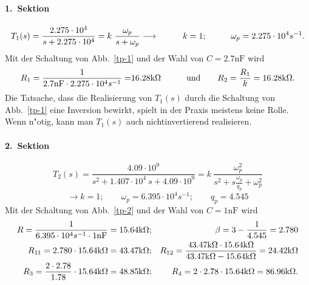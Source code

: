 \paragraph{1.~Sektion}
\[ T_1(s)=\frac{2.275 \cdot 10^4}{s + 2.275 \cdot 10^4}
         =k~ \frac{\omega_p}{s + \omega_p} \longrightarrow \hspace*{1cm} k=1; \hspace*{1cm}
   \omega_p=2.275 \cdot 10^4 s^{-1}. \]
\nit Mit der Schaltung von Abb.~\ref{tp-1} und der Wahl von $C=2.7\mbox{nF}$
wird
\begin{eqnarray*}
R_1=\frac{1}{2.7 {\rm nF} \cdot 2.275 \cdot 10^4 s^{-1}}
  =&16.28 {\rm k}\Omega&\qquad\text{und}\qquad 
R_2=\frac{R_1}{k}=16.28 {\rm k}\Omega. 
\end{eqnarray*}
\nit Die Tatsache, dass die Realisierung von $T_1(s)$ durch die
Schaltung von Abb.~\ref{tp-1} eine Inversion bewirkt, spielt in der
Praxis meistens keine Rolle.  Wenn n"otig, kann man $T_1(s)$ auch
nichtinvertierend realisieren.
\paragraph{2.~Sektion}
\[ T_2(s)=\frac{4.09\cdot 10^9}{s^2+1.407\cdot 10^4 ~s+4.09\cdot 10^9}
        =k~ \frac{\omega_p^2}{s^2+s\frac{\omega_p}{q_p}+\omega_p^2}\]
\[\longrightarrow k=1;\qquad  \omega_p=6.395 \cdot 10^4 s^{-1}; \qquad    q_p=4.545 \]
\nit Mit der Schaltung von Abb.~\ref{tp-2} und der Wahl von $C=1\mbox{nF}$
wird
\begin{eqnarray*}
R=\frac{1}{6.395 \cdot 10^4 s^{-1} \cdot 1 {\rm nF}} 
 =15.64 {\rm k}\Omega;&& \beta = 3-\frac{1}{4.545}=2.780 \\
R_{11}=2.780 \cdot 15.64 {\rm k}\Omega=43.47 {\rm k}\Omega;&&
R_{12}=\frac{43.47 {\rm k}\Omega \cdot 15.64 {\rm k}\Omega}
                {43.47 {\rm k}\Omega-15.64 {\rm k}\Omega}
 =24.42 {\rm k}\Omega \\
R_3= \frac{2 \cdot 2.78}{1.78} \cdot 15.64 {\rm k}\Omega
 =48.85 {\rm k}\Omega;&& R_4=2 \cdot 2.78 \cdot 15.64 {\rm k}\Omega=86.96 {\rm k}\Omega.
\end{eqnarray*}
